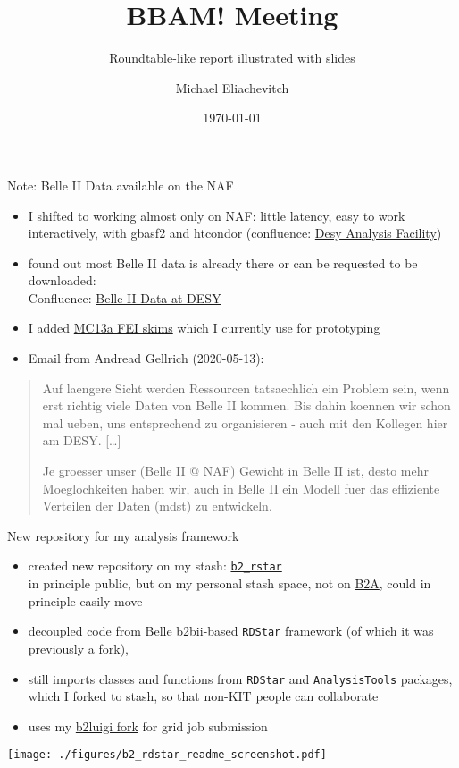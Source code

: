 \documentclass[aspectratio=169, 16pt]{beamer}
\author{Michael Eliachevitch}
\date{\today}
\title{BBAM! Meeting}
\subtitle{Roundtable-like report illustrated with slides}
\institute{Physikalisches Institut --- Rheinische Friedrich-Wilhelms-Universität Bonn}
\begin{document}
\maketitle
\begin{frame}[label={sec:org5c962f9}]{Note: Belle II Data available on the NAF}
\begin{itemize}
\item I shifted to working almost only on NAF: little latency, easy to work
interactively, with gbasf2 and htcondor (confluence: \href{https://confluence.desy.de/display/BI/DESY+Analysis+Facility}{Desy Analysis Facility})
\item found out most Belle II data is already there or can be requested to be downloaded:\\
Confluence: \href{https://confluence.desy.de/display/BI/Belle+II+Data+at+DESY}{Belle II Data at DESY}
\item I added \href{https://confluence.desy.de/display/BI/Belle+II+MC+at+DESY\#BelleIIMCatDESY-MC13:Skims}{MC13a FEI skims} which I currently use for prototyping

\item Email from Andread Gellrich (2020-05-13):
\end{itemize}
\begin{quote}
\scriptsize
Auf laengere Sicht werden Ressourcen tatsaechlich ein
Problem sein, wenn erst richtig viele Daten von
Belle II kommen.
Bis dahin koennen wir schon mal ueben, uns entsprechend
zu organisieren - auch mit den Kollegen hier am DESY.
[\ldots{}]

Je groesser unser (Belle II @ NAF) Gewicht in Belle II ist,
desto mehr Moeglochkeiten haben wir, auch in Belle II
ein Modell fuer das effiziente Verteilen der Daten (mdst)
zu entwickeln.
\end{quote}
\end{frame}

\begin{frame}[label={sec:org9ac439f},fragile]{New repository for my analysis framework}
 \begin{itemize}
\item created new repository on my stash: \href{https://stash.desy.de/users/meliache/repos/b2\_rdstar/browse}{\texttt{b2\_rstar}}\\
in principle public, but on my personal stash space, not on \href{https://stash.desy.de/projects/B2A}{B2A}, could in principle easily move
\item decoupled code from Belle b2bii-based \texttt{RDStar} framework (of which it was
previously a fork),
\item still imports classes and functions from \texttt{RDStar} and \texttt{AnalysisTools}
packages, which I forked to stash, so that non-KIT people can collaborate
\item uses my \href{https://github.com/meliache/b2luigi}{b2luigi fork} for grid job submission
\end{itemize}

\begin{center}
\texttt{[image: ./figures/b2\_rdstar\_readme\_screenshot.pdf]}
\end{center}
\end{frame}
\end{document}

